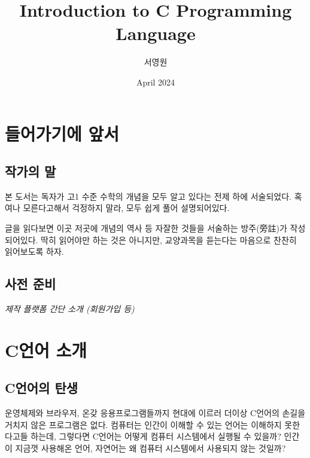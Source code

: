 \documentclass[a4paper,12pt]{book}
\title{Introduction to C Programming Language}
\author{서영원}
\date{April 2024}
\begin{document}
\linespread{1.5}

\maketitle

\tableofcontents

\vfill
\doclicenseThis


\pagebreak



\chapter{들어가기에 앞서}


\section{작가의 말}

본 도서는 독자가 고1 수준 수학의 개념을 모두 알고 있다는 전제 하에 서술되었다.
혹여나 모른다고해서 걱정하지 말라, 모두 쉽게 풀어 설명되어있다.

글을 읽다보면 이곳 저곳에 개념의 역사 등 자잘한 것들을 서술하는 방주(旁註)가 작성되어있다.
딱히 읽어야만 하는 것은 아니지만, 교양과목을 듣는다는 마음으로 찬찬히 읽어보도록 하자.


\section{사전 준비}

\textit{제작 플랫폼 간단 소개 (회원가입 등)}


\chapter{C언어 소개}


\section{C언어의 탄생}

운영체제와 브라우저, 온갖 응용프로그램들까지 현대에 이르러 더이상
C언어의 손길을 거치지 않은 프로그램은 없다.
컴퓨터는 인간이 이해할 수 있는 언어는 이해하지 못한다고들 하는데,
그렇다면 C언어는 어떻게 컴퓨터 시스템에서 실행될 수 있을까?
인간이 지금껏 사용해온 언어, 자연어는 왜 컴퓨터 시스템에서 사용되지 않는
것일까?
\end{document}
